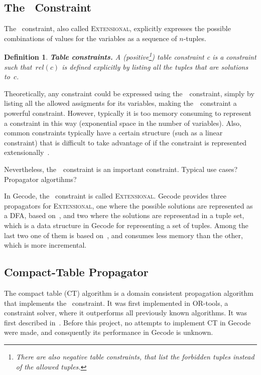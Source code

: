 \documentclass[a4paper,11pt]{article}
\newtheorem{definition}{Definition}
\newcommand{\Todo}[1]{{\color{blue}#1}}
\newcommand{\Table}{\Constraint{Table}}
\newcommand{\Extensional}{\Constraint{Extensional}~}
\def\Extensional{\textsc{Extensional}}
\newcommand{\CTpaper}[0]{DBLP:conf/cp/DemeulenaereHLP16}
\numberwithin{equation}{section}
\begin{document}
\subsection{The \Table~Constraint}
\label{bg:table}
The \Table~constraint, also called \Extensional,
explicitly expresses the possible combinations of values for the variables as a
sequence of $n$-tuples.

\begin{definition}
  \textbf{Table constraints.} A
  (positive\footnote{There are also negative table constraints, that list the forbidden tuples instead of the allowed tuples.})
  \emph{table constraint c} is a
  constraint such that~$rel(c)$ is defined explicitly by listing all the
  tuples that are solutions to~$c$.
\end{definition}

Theoretically, any constraint could be expressed using the~\Table~constraint,
simply by listing all the allowed assigments for its variables, 
making the~\Table~constraint a powerful constraint. However, typically
it is too memory consuming to represent a constraint in this way
(exponential space in the number of variables). Also, common constraints
typically have a certain structure (such as a linear constraint)
that is difficult to take advantage of if the constraint is represented
extensionally~\cite{SchulteCarlsson:FDsys}.

Nevertheless, the~\Table~constraint is an important constraint.
\Todo{Typical use cases? Propagator algortihms?}

In Gecode, the \Table~constraint is called \Extensional. Gecode provides
three propagators for \Extensional, one where the possible solutions are
represented as a DFA, based on~\cite{Pesant:seqs}, and two where the solutions
are representad in a tuple set, which is a data structure in Gecode for representing 
a set of tuples. Among the last two one of them is based 
on~\cite{DBLP:journals/ai/BessiereRYZ05}, and consumes less memory than the
other, which is more incremental. 


\subsection{Compact-Table Propagator}
\label{bg:ct}
The compact table (CT) algorithm is a domain consistent propagation algorithm
that implements the \Table~constraint. It was first implemented in
OR-tools, a constraint solver, where it outperforms all previously
known algorithms. It was first described in~\cite{\CTpaper}.
Before this project, no attempts to implement CT in Gecode were made,
and consquently its performance in Gecode is unknown.
\end{document}
